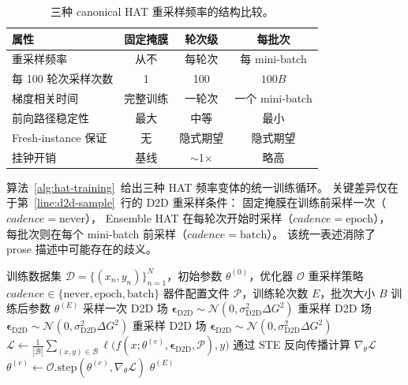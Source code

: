\begin{table}[t]
    \centering
    \caption{三种 canonical HAT 重采样频率的结构比较。}
    \label{tab:cadence-comparison}
    \small
    \begin{tabular}{lccc}
        \toprule
        \textbf{属性} & \textbf{固定掩膜} & \textbf{轮次级} & \textbf{每批次} \\
        \midrule
        重采样频率 & 从不 & 每轮次 & 每 mini-batch \\
        每 100 轮次采样次数 & 1 & 100 & $100B$ \\
        梯度相关时间 & 完整训练 & 一轮次 & 一个 mini-batch \\
        前向路径稳定性 & 最大 & 中等 & 最小 \\
        Fresh-instance 保证 & 无 & 隐式期望 & 隐式期望 \\
        挂钟开销 & 基线 & $\sim$1$\times$ & 略高 \\
        \bottomrule
    \end{tabular}
\end{table}

算法~\ref{alg:hat-training}~给出三种 HAT 频率变体的统一训练循环。
关键差异仅在于第~\ref{line:d2d-sample}~行的 D2D 重采样条件：
固定掩膜在训练前采样一次（$\mathit{cadence}=\text{never}$），
Ensemble HAT 在每轮次开始时采样（$\mathit{cadence}=\text{epoch}$），
每批次则在每个 mini-batch 前采样（$\mathit{cadence}=\text{batch}$）。
该统一表述消除了 prose 描述中可能存在的歧义。

\begin{algorithm}[t]
\caption{HAT 训练循环（统一三种重采样频率）}
\label{alg:hat-training}
\begin{algorithmic}[1]
\Require 训练数据集 $\mathcal{D}=\{(x_n,y_n)\}_{n=1}^{N}$，初始参数 $\theta^{(0)}$，优化器 $\mathcal{O}$
\Require 重采样策略 $\mathit{cadence} \in \{\text{never}, \text{epoch}, \text{batch}\}$
\Require 器件配置文件 $\mathcal{P}$，训练轮次数 $E$，批次大小 $B$
\Ensure 训练后参数 $\theta^{(E)}$
    \State 采样一次 D2D 场 $\boldsymbol{\epsilon}_{\text{D2D}} \sim \mathcal{N}(0, \sigma_{\text{D2D}}^{2} \Delta G^{2})$ 
\EndIf
{} 
        \State 重采样 D2D 场 $\boldsymbol{\epsilon}_{\text{D2D}} \sim \mathcal{N}(0, \sigma_{\text{D2D}}^{2} \Delta G^{2})$  \label{line:d2d-sample}
    \EndIf
            \State 重采样 D2D 场 $\boldsymbol{\epsilon}_{\text{D2D}} \sim \mathcal{N}(0, \sigma_{\text{D2D}}^{2} \Delta G^{2})$ 
        \EndIf
        \State $\mathcal{L} \gets \frac{1}{|\mathcal{B}|} \sum_{(x,y) \in \mathcal{B}} \ell\bigl(f(x; \theta^{(e)}, \boldsymbol{\epsilon}_{\text{D2D}}, \mathcal{P}), y\bigr)$
        \State 通过 STE 反向传播计算 $\nabla_{\theta} \mathcal{L}$
        \State $\theta^{(e)} \gets \mathcal{O}.\text{step}(\theta^{(e)}, \nabla_{\theta} \mathcal{L})$
    \EndFor
\EndFor
\State \Return $\theta^{(E)}$
\end{algorithmic}
\end{algorithm}

